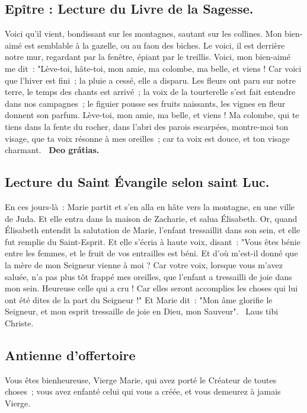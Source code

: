 \begin{multicols}{2}
\subsection*{Epître : Lecture du Livre de la Sagesse.}
Voici qu’il vient, bondissant sur les montagnes, sautant sur les collines. Mon bien-aimé est semblable à la gazelle, ou au faon des biches. Le voici, il est derrière notre mur, regardant par la fenêtre, épiant par le treillis. Voici, mon bien-aimé me dit~: "Lève-toi, hâte-toi, mon amie, ma colombe, ma belle, et viens ! Car voici que l’hiver est fini~; la pluie a cessé, elle a disparu. Les fleurs ont paru sur notre terre, le temps des chants est arrivé~; la voix de la tourterelle s’est fait entendre dans nos campagnes~; le figuier pousse ses fruits naissants, les vignes en fleur donnent son parfum. Lève-toi, mon amie, ma belle, et viens ! Ma colombe, qui te tiens dans la fente du rocher, dans l’abri des parois escarpées, montre-moi ton visage, que ta voix résonne à mes oreilles~; car ta voix est douce, et ton visage charmant.
\textbf{\rb\ Deo grátias.}

\subsection*{Lecture du Saint Évangile selon saint Luc.}
En ces jours-là~: Marie partit et s’en alla en hâte vers la montagne, en une ville de Juda. Et elle entra dans la maison de Zacharie, et salua Élisabeth. Or, quand Élisabeth entendit la salutation de Marie, l’enfant tressaillit dans son sein, et elle fut remplie du Saint-Esprit. Et elle s’écria à haute voix, disant~: "Vous êtes bénie entre les femmes, et le fruit de vos entrailles est béni. Et d’où m’est-il donné que la mère de mon Seigneur vienne à moi ? Car votre voix, lorsque vous m’avez saluée, n’a pas plus tôt frappé mes oreilles, que l’enfant a tressailli de joie dans mon sein. Heureuse celle qui a cru ! Car elles seront accomplies les choses qui lui ont été dites de la part du Seigneur !" Et Marie dit~: "Mon âme glorifie le Seigneur, et mon esprit tressaille de joie en Dieu, mon Sauveur".
{\textbf \rb\ Laus tibi Christe.}

\subsection*{Antienne d'offertoire}
Vous êtes bienheureuse, Vierge Marie, qui avez porté le Créateur de toutes choses ; vous avez enfanté celui qui vous a créée, et vous demeurez à jamais Vierge.


\end{multicols}
